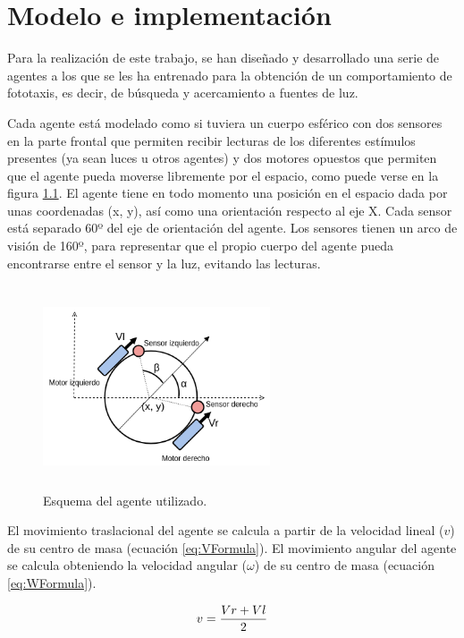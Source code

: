 \chapter{Modelo e implementación}
Para la realización de este trabajo, se han diseñado y desarrollado una serie de agentes a los que se les ha entrenado para la obtención de un comportamiento de fototaxis, es decir, de
búsqueda y acercamiento a fuentes de luz.

Cada agente está modelado como si tuviera un cuerpo esférico con dos sensores en la parte frontal que permiten recibir lecturas de los diferentes estímulos presentes (ya sean luces u otros agentes) y dos motores opuestos
que permiten que el agente pueda moverse libremente por el espacio, como puede verse
en la figura \ref{fig:figuraMyAgent}. El agente tiene en todo momento una posición en el espacio dada por unas coordenadas (x, y), así como una orientación respecto al eje X. Cada sensor está separado
60º del eje de orientación del agente. Los sensores tienen un arco de visión de 160º, para representar que el propio cuerpo del agente pueda encontrarse entre el sensor y la luz, evitando las lecturas.

\begin{figure}[H]
	\centering
	\includegraphics[width=0.6\textwidth,height=6cm]{Imagenes/Agent}
	\caption{Esquema del agente utilizado.}
	\label{fig:figuraMyAgent}
\end{figure}

El movimiento traslacional del agente se calcula a partir de la velocidad lineal ($v$) de su centro de masa (ecuación \ref{eq:VFormula}). El movimiento angular del agente se calcula obteniendo
la velocidad angular ($\omega$) de su centro de masa (ecuación \ref{eq:WFormula}).

\begin{equation} \label{eq:VFormula}
 \centering
 v = \frac{Vr + Vl}{2}
\end{equation}

